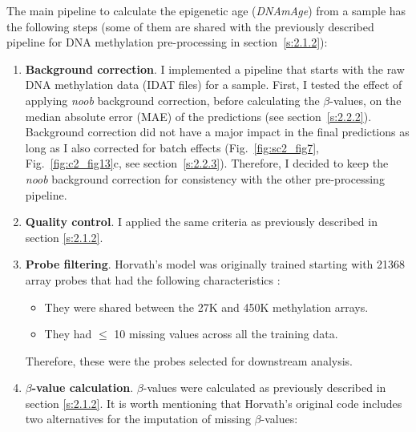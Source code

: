 \bigskip

The main pipeline to calculate the epigenetic age (\textit{DNAmAge}) from a sample has the following steps (some of them are shared with the previously described pipeline for DNA methylation pre-processing in section~\ref{s:2.1.2}):

\begin{enumerate}
	
	\item \textbf{Background correction}. I implemented a pipeline that starts with the raw DNA methylation data (IDAT files) for a sample. First, I tested the effect of applying \textit{noob} background correction, before calculating the $\beta$-values, on the median absolute error (MAE) of the predictions (see section~\ref{s:2.2.2}).  Background correction did not have a major impact in the final predictions as long as I also corrected for batch effects (Fig.~\ref{fig:sc2_fig7}, Fig.~\ref{fig:c2_fig13}c, see section~\ref{s:2.2.3}). Therefore, I decided to keep the \textit{noob} background correction for consistency with the other pre-processing pipeline.
	
	\item \textbf{Quality control}. I applied the same criteria as previously described in section \ref{s:2.1.2}.
	
	\item \textbf{Probe filtering}. Horvath's model was originally trained starting with 21368 array probes that had the following characteristics \citep{Horvath2013}:
	
	\begin{itemize}
		
		\item They were shared between the 27K and 450K methylation arrays.
		
		\item They had $\leq$ 10 missing values across all the training data.
		
	\end{itemize}
	
	 Therefore, these were the probes selected for downstream analysis.
	
	\item \textbf{$\beta$-value calculation}. $\beta$-values were calculated as previously described in section \ref{s:2.1.2}. It is worth mentioning that Horvath's original code includes two alternatives for the imputation of missing $\beta$-values:
	
	\begin{itemize}
		

\end{itemize}
\end{enumerate}
